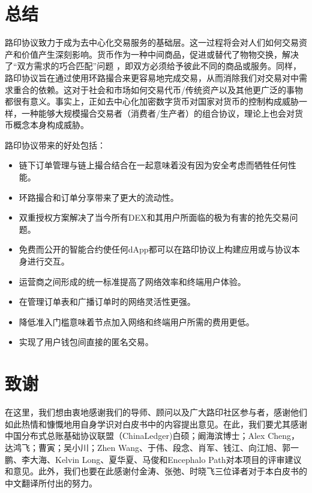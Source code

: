 \documentclass[UTF8]{ctexart}
\begin{document}
\begin{multicols}{2}
\section{总结}

路印协议致力于成为去中心化交易服务的基础层。这一过程将会对人们如何交易资产和价值产生深刻影响。货币作为一种中间商品，促进或替代了物物交换，解决了“双方需求的巧合匹配”问题 \cite{unenumerated2006}，即双方必须给予彼此不同的商品或服务。同样，路印协议旨在通过使用环路撮合来更容易地完成交易，从而消除我们对交易对中需求重合的依赖。这对于社会和市场如何交易代币/传统资产以及其他更广泛的事物都很有意义。事实上，正如去中心化加密数字货币对国家对货币的控制构成威胁一样，一种能够大规模撮合交易者（消费者/生产者）的组合协议，理论上也会对货币概念本身构成威胁。

路印协议带来的好处包括：

\begin{itemize}
	\item 链下订单管理与链上撮合结合在一起意味着没有因为安全考虑而牺牲任何性能。
	\item 环路撮合和订单分享带来了更大的流动性。
	\item 双重授权方案解决了当今所有DEX和其用户所面临的极为有害的抢先交易问题。
	\item 免费而公开的智能合约使任何dApp都可以在路印协议上构建应用或与协议本身进行交互。
	\item 运营商之间形成的统一标准提高了网络效率和终端用户体验。
	\item 在管理订单表和广播订单时的网络灵活性更强。
	\item 降低准入门槛意味着节点加入网络和终端用户所需的费用更低。
	\item 实现了用户钱包间直接的匿名交易。
\end{itemize}

\section{致谢}
在这里，我们想由衷地感谢我们的导师、顾问以及广大路印社区参与者，感谢他们如此热情和慷慨地用自身学识对白皮书中的内容提出意见。在此，我们要尤其感谢中国分布式总账基础协议联盟（ChinaLedger)白硕；阚海滨博士；Alex  Cheng，达鸿飞；曹寅；吴小川；Zhen  Wang、于伟、段念、肖军、钱江、向江旭、郭一鹏、李大海、Kelvin Long、夏华夏、马俊和Encephalo Path对本项目的评审建议和意见。此外，我们也要在此感谢付金涛、张弛、时晓飞三位译者对于本白皮书的中文翻译所付出的努力。






\end{multicols}
\end{document}
